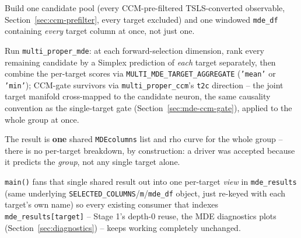 \documentclass[11pt]{article}
\begin{document}
\begin{steps}
\item Build one candidate pool (every CCM-pre-filtered TSLS-converted observable, Section~\ref{sec:ccm-prefilter}, every target excluded) and one windowed \texttt{mde\_df} containing \emph{every} target column at once, not just one.
\item Run \texttt{multi\_proper\_mde}: at each forward-selection dimension, rank every remaining candidate by a Simplex prediction of \emph{each} target separately, then combine the per-target scores via \texttt{MULTI\_MDE\_TARGET\_AGGREGATE} (\texttt{'mean'} or \texttt{'min'}); CCM-gate survivors via \texttt{multi\_proper\_ccm}'s \texttt{t2c} direction -- the joint target manifold cross-mapped to the candidate neuron, the same causality convention as the single-target gate (Section~\ref{sec:mde-ccm-gate}), applied to the whole group at once.
\item The result is \textbf{one} shared \texttt{MDEcolumns} list and rho curve for the whole group -- there is no per-target breakdown, by construction: a driver was accepted because it predicts the \emph{group}, not any single target alone.
\item \texttt{main()} fans that single shared result out into one per-target \emph{view} in \texttt{mde\_results} (same underlying \texttt{SELECTED\_COLUMNS}/\texttt{m}/\texttt{mde\_df} object, just re-keyed with each target's own name) so every existing consumer that indexes \texttt{mde\_results[target]} -- Stage 1's depth-0 reuse, the MDE diagnostics plots (Section~\ref{sec:diagnostics}) -- keeps working completely unchanged.
\end{steps}
\end{document}
